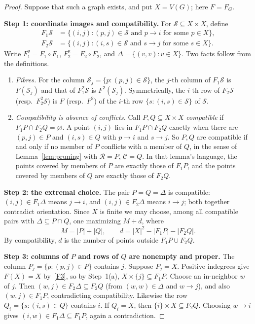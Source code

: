 \documentclass[11pt]{article}
\theoremstyle{remark}
\newcommand{\abs}[1]{\lvert #1\rvert}
\newcommand{\step}[1]{\par\medskip\noindent\textbf{#1}\enspace}
\begin{document}
\begin{proof}
Suppose that such a graph exists, and put $X=V(G)$; here $F=F_G$.

\step{Step 1: coordinate images and compatibility.}
For $\mathcal S\subseteq X\times X$, define
\[
 \begin{aligned}
 F_1\mathcal S&=\{(i,j): (p,j)\in \mathcal S\text{ and }p\to i
                     \text{ for some }p\in X\},\\
 F_2\mathcal S&=\{(i,j): (i,s)\in \mathcal S\text{ and }s\to j
                     \text{ for some }s\in X\}.
 \end{aligned}
\]
Write $F_1^2=F_1\circ F_1$, $F_2^2=F_2\circ F_2$, and
$\Delta=\{(v,v):v\in X\}$.  Two facts follow from the definitions.
\begin{enumerate}[label=\textup{(\alph*)},nosep]
\item \emph{Fibres.}  For the column $\mathcal S_j=\{p:(p,j)\in\mathcal S\}$,
 the $j$-th column of $F_1\mathcal S$ is $F(\mathcal S_j)$ and that of
 $F_1^2\mathcal S$ is $F^2(\mathcal S_j)$.  Symmetrically, the $i$-th row of
 $F_2\mathcal S$ (resp.\ $F_2^2\mathcal S$) is $F$ (resp.\ $F^2$) of the
 $i$-th row $\{s:(i,s)\in\mathcal S\}$ of $\mathcal S$.
\item \emph{Compatibility is absence of conflicts.}  Call
 $P,Q\subseteq X\times X$ \emph{compatible} if
 $F_1P\cap F_2Q=\varnothing$.  A point $(i,j)$ lies in $F_1P\cap F_2Q$
 exactly when there are $(p,j)\in P$ and $(i,s)\in Q$ with $p\to i$ and
 $s\to j$.  So $P,Q$ are compatible if and only if no member of $P$
 conflicts with a member of $Q$, in the sense of Lemma~\ref{lem:pruning}
 with $\mathcal R=P$, $\mathcal C=Q$.  In that lemma's language, the points
 covered by members of $P$ are exactly those of $F_1P$, and the points
 covered by members of $Q$ are exactly those of $F_2Q$.
\end{enumerate}

\step{Step 2: the extremal choice.}
The pair $P=Q=\Delta$ is compatible: $(i,j)\in F_1\Delta$ means $j\to i$,
and $(i,j)\in F_2\Delta$ means $i\to j$; both together contradict
orientation.  Since $X$ is finite we may choose, among all compatible pairs
with $\Delta\subseteq P\cap Q$, one maximizing $M+d$, where
\[
 M=\abs{P}+\abs{Q},\qquad
 d=\abs{X}^2-\abs{F_1P}-\abs{F_2Q}.
\]
By compatibility, $d$ is the number of points outside $F_1P\cup F_2Q$.

\step{Step 3: columns of $P$ and rows of $Q$ are nonempty and proper.}
The column $P_j=\{p:(p,j)\in P\}$ contains $j$.  Suppose $P_j=X$.
Positive indegrees give $F(X)=X$ by~\ref{F3}, so by Step~1(a),
$X\times\{j\}\subseteq F_1P$.  Choose an in-neighbor $w$ of $j$.  Then
$(w,j)\in F_2\Delta\subseteq F_2Q$ (from $(w,w)\in\Delta$ and $w\to j$),
and also $(w,j)\in F_1P$, contradicting compatibility.
Likewise the row $Q_i=\{s:(i,s)\in Q\}$ contains $i$.  If $Q_i=X$, then
$\{i\}\times X\subseteq F_2Q$.  Choosing $w\to i$ gives
$(i,w)\in F_1\Delta\subseteq F_1P$, again a contradiction.


\end{proof}
\end{document}
